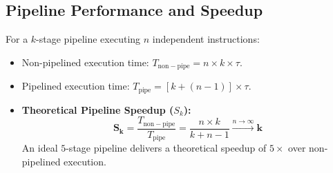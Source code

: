 \documentclass[12pt,a4paper]{article}
\begin{document}
\subsection{Pipeline Performance and Speedup}
For a $k$-stage pipeline executing $n$ independent instructions:
\begin{itemize}[leftmargin=*]
  \item Non-pipelined execution time: $T_{\mathrm{non-pipe}} = n \times k \times \tau$.
  \item Pipelined execution time: $T_{\mathrm{pipe}} = [k + (n - 1)] \times \tau$.
  \item \textbf{Theoretical Pipeline Speedup ($S_k$):}
  \[
  \mathbf{S_k} = \frac{T_{\mathrm{non-pipe}}}{T_{\mathrm{pipe}}} = \frac{n \times k}{k + n - 1} \xrightarrow{n \to \infty} \mathbf{k}
  \]
  An ideal $5$-stage pipeline delivers a theoretical speedup of $5\times$ over non-pipelined execution.
\end{itemize}
\end{document}
